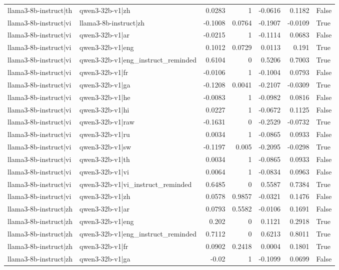 \begin{table}
\begin{tabular}{l l r r r r l}
llama3-8b-instruct|th & qwen3-32b-v1|zh & 0.0283 & 1 & -0.0616 & 0.1182 & False \\
llama3-8b-instruct|vi & llama3-8b-instruct|zh & -0.1008 & 0.0764 & -0.1907 & -0.0109 & True \\
llama3-8b-instruct|vi & qwen3-32b-v1|ar & -0.0215 & 1 & -0.1114 & 0.0683 & False \\
llama3-8b-instruct|vi & qwen3-32b-v1|eng & 0.1012 & 0.0729 & 0.0113 & 0.191 & True \\
llama3-8b-instruct|vi & qwen3-32b-v1|eng_instruct_reminded & 0.6104 & 0 & 0.5206 & 0.7003 & True \\
llama3-8b-instruct|vi & qwen3-32b-v1|fr & -0.0106 & 1 & -0.1004 & 0.0793 & False \\
llama3-8b-instruct|vi & qwen3-32b-v1|ga & -0.1208 & 0.0041 & -0.2107 & -0.0309 & True \\
llama3-8b-instruct|vi & qwen3-32b-v1|he & -0.0083 & 1 & -0.0982 & 0.0816 & False \\
llama3-8b-instruct|vi & qwen3-32b-v1|hi & 0.0227 & 1 & -0.0672 & 0.1125 & False \\
llama3-8b-instruct|vi & qwen3-32b-v1|raw & -0.1631 & 0 & -0.2529 & -0.0732 & True \\
llama3-8b-instruct|vi & qwen3-32b-v1|ru & 0.0034 & 1 & -0.0865 & 0.0933 & False \\
llama3-8b-instruct|vi & qwen3-32b-v1|sw & -0.1197 & 0.005 & -0.2095 & -0.0298 & True \\
llama3-8b-instruct|vi & qwen3-32b-v1|th & 0.0034 & 1 & -0.0865 & 0.0933 & False \\
llama3-8b-instruct|vi & qwen3-32b-v1|vi & 0.0064 & 1 & -0.0834 & 0.0963 & False \\
llama3-8b-instruct|vi & qwen3-32b-v1|vi_instruct_reminded & 0.6485 & 0 & 0.5587 & 0.7384 & True \\
llama3-8b-instruct|vi & qwen3-32b-v1|zh & 0.0578 & 0.9857 & -0.0321 & 0.1476 & False \\
llama3-8b-instruct|zh & qwen3-32b-v1|ar & 0.0793 & 0.5582 & -0.0106 & 0.1691 & False \\
llama3-8b-instruct|zh & qwen3-32b-v1|eng & 0.202 & 0 & 0.1121 & 0.2918 & True \\
llama3-8b-instruct|zh & qwen3-32b-v1|eng_instruct_reminded & 0.7112 & 0 & 0.6213 & 0.8011 & True \\
llama3-8b-instruct|zh & qwen3-32b-v1|fr & 0.0902 & 0.2418 & 0.0004 & 0.1801 & True \\
llama3-8b-instruct|zh & qwen3-32b-v1|ga & -0.02 & 1 & -0.1099 & 0.0699 & False \\

\end{tabular}
\end{table}
